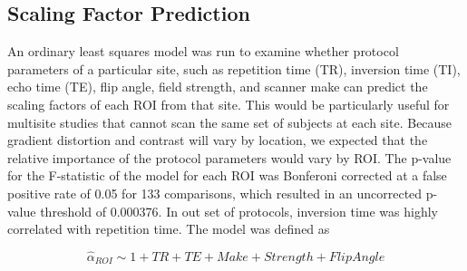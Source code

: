 \subsection{Scaling Factor Prediction}

An ordinary least squares model was run to examine whether protocol parameters of a particular site, such as repetition time (TR), inversion time (TI), echo time (TE), flip angle, field strength, and scanner make can predict the scaling factors of each ROI from that site. This would be particularly useful for multisite studies that cannot scan the same set of subjects at each site. Because gradient distortion and contrast will vary by location, we expected that the relative importance of the protocol parameters would vary by ROI. The p-value for the F-statistic of the model for each ROI was Bonferoni corrected at a false positive rate of 0.05 for 133 comparisons, which resulted in an uncorrected p-value threshold of 0.000376. In out set of protocols, inversion time was highly correlated with repetition time. The model was defined as

\begin{equation}
\hat{\alpha}_{ROI} \sim 1 + TR+ TE + Make + Strength + FlipAngle
\end{equation}
